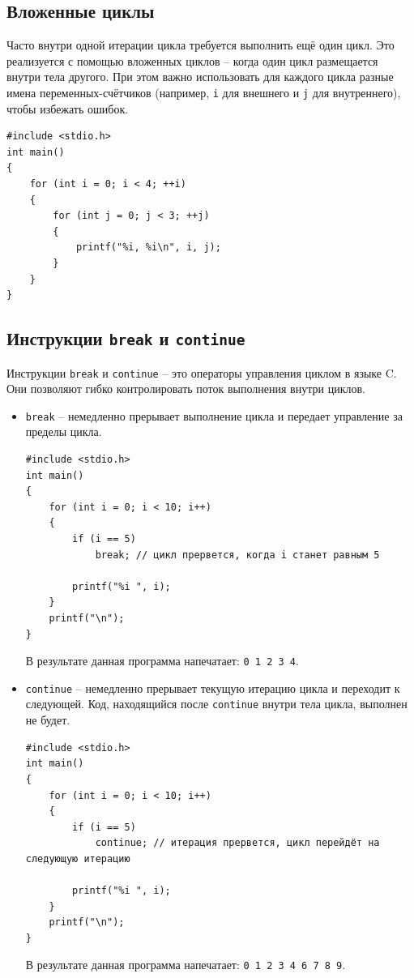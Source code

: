 \documentclass[10pt]{article}
\begin{document}
\subsection*{Вложенные циклы}
Часто внутри одной итерации цикла требуется выполнить ещё один цикл. Это реализуется с помощью вложенных циклов -- когда один цикл размещается внутри тела другого. При этом важно использовать для каждого цикла разные имена переменных-счётчиков (например, \texttt{i} для внешнего и \texttt{j} для внутреннего), чтобы избежать ошибок.
\begin{lstlisting}
#include <stdio.h>
int main()
{
    for (int i = 0; i < 4; ++i)
    {
        for (int j = 0; j < 3; ++j)
        {
            printf("%i, %i\n", i, j);
        }
    }
}
\end{lstlisting}

\subsection*{Инструкции \texttt{break} и \texttt{continue}}
Инструкции \texttt{break} и \texttt{continue} -- это операторы управления циклом в языке C. Они позволяют гибко контролировать поток выполнения внутри циклов.
\begin{itemize}
\item \texttt{break} -- немедленно прерывает выполнение цикла и передает управление за пределы цикла.
\begin{lstlisting}
#include <stdio.h>
int main()
{
	for (int i = 0; i < 10; i++) 
	{
    	if (i == 5)
        	break; // цикл прервется, когда i станет равным 5
        
    	printf("%i ", i);
	}
	printf("\n");
}
\end{lstlisting}
В результате данная программа напечатает: \texttt{0 1 2 3 4}.

\item \texttt{continue} -- немедленно прерывает текущую итерацию цикла и переходит к следующей. Код, находящийся после \texttt{continue} внутри тела цикла, выполнен не будет.
\begin{lstlisting}
#include <stdio.h>
int main()
{
	for (int i = 0; i < 10; i++) 
	{
    	if (i == 5)
        	continue; // итерация прервется, цикл перейдёт на следующую итерацию
        
    	printf("%i ", i);
	}
	printf("\n");
}
\end{lstlisting}
В результате данная программа напечатает: \texttt{0 1 2 3 4 6 7 8 9}.
\end{itemize}
\end{document}
